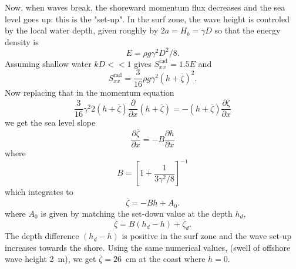 Now, when waves break, the shoreward momentum flux decreases and the sea level goes up: this is the "set-up". In the surf zone, the wave height is controled by the local water depth, given roughly by $2a=H_b=\gamma D$ so that the energy density  is 
\begin{equation}
    E=\rho g \gamma^2 D^2/8.
\end{equation}
Assuming shallow water  $kD <<
1$ gives $S^{\mathrm{rad}}_{xx} =  1.5 E$ and 
\begin{equation}
    S^{\mathrm{rad}}_{xx}=\frac{3}{16}\rho g \gamma^2 \left(h+\overline{\zeta}\right)^2.
\end{equation}
Now replacing that in the momentum equation
\begin{equation}
    \frac{3}{16} \gamma^2 2\left(h+\overline{\zeta}\right)
    \frac{\partial}{\partial x} \left(h+\overline{\zeta}\right)
    =- \left(h+\overline{\zeta}\right)\frac{\partial \overline{\zeta}}{\partial x}
\end{equation}
we get the sea level slope
\begin{equation}
    \frac{\partial \overline{\zeta}}{\partial x}
    =- B \frac{\partial h}{\partial x}
\end{equation}
where
\begin{equation}
    B=\left[1+\frac{1}{3 \gamma^2/8}\right]^{-1}
\end{equation}
which integrates to 
\begin{equation}
    \overline{\zeta}
    =-B h + A_0.
\end{equation}
where $A_0$ is given by matching the set-down value at the depth $h_d$, 
\begin{equation}
    \overline{\zeta}
    =B \left(h_d-h\right) + \overline{\zeta}_d.
\end{equation}
The depth difference $\left(h_d-h\right)$ is positive in the surf zone and the wave set-up increases towards the shore. Using the same numerical values, 
(swell of offshore wave height 2~m),  we get  $\overline{\zeta}=26$~cm at the coast where $h=0$.

